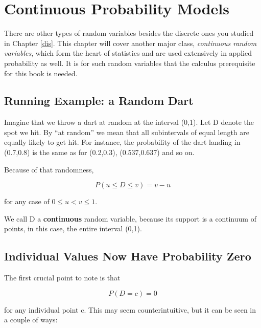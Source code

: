 \chapter{Continuous Probability Models}  
\label{chap:contin}

There are other types of random variables besides the discrete ones you
studied in Chapter \ref{dis}.  This chapter will cover another major
class, {\it continuous random variables}, which form the heart of
statistics and are used extensively in applied probability as well.  It
is for such random variables that the calculus prerequisite for this
book is needed.

\section{Running Example:  a Random Dart}
\label{dart}

Imagine that we throw a dart at random at the interval (0,1).  Let D
denote the spot we hit.  By ``at random'' we mean that all subintervals
of equal length are equally likely to get hit.  For instance, the
probability of the dart landing in (0.7,0.8) is the same as for
(0.2,0.3), (0.537,0.637) and so on.

Because of that randomness, 

\begin{equation}
\label{vminusu}
P(u \leq D \leq v) = v-u
\end{equation}

for any case of $0 \leq u < v \leq 1$.

We call D a {\bf continuous} random variable, because its support is a
continuum of points, in this case, the entire interval (0,1).

\section{Individual Values Now Have Probability Zero}

The first crucial point to note is that 

\begin{equation}
\label{itszero}
P(D = c) = 0
\end{equation}

for any individual point c.  This may seem counterintuitive, but it can
be seen in a couple of ways:

